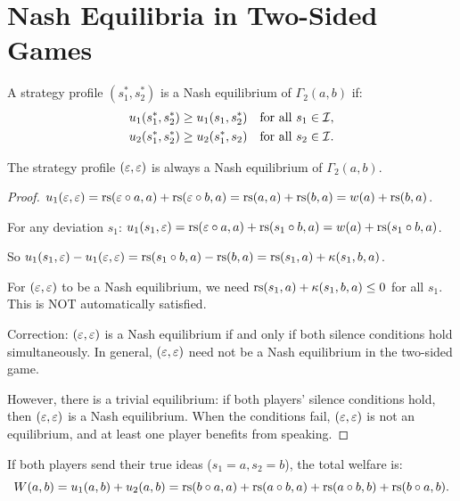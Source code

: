 \section{Nash Equilibria in Two-Sided Games}

\begin{definition}
\label{def:nash-two-sided}
A strategy profile $(s_1^*, s_2^*)$ is a Nash equilibrium of $\Gamma_2(a, b)$
if:
\begin{align*}
u_1(s_1^*, s_2^*) &\geq u_1(s_1, s_2^*) &\text{for all } s_1 \in \mathcal{I}, \\
u_2(s_1^*, s_2^*) &\geq u_2(s_1^*, s_2) &\text{for all } s_2 \in \mathcal{I}.
\end{align*}
\end{definition}

\begin{theorem}
\label{thm:void-void-nash}
The strategy profile $(\varepsilon, \varepsilon)$ is always a Nash equilibrium of
$\Gamma_2(a, b)$.
\end{theorem}

\begin{proof}
$u_1(\varepsilon, \varepsilon) = \mathrm{rs}(\varepsilon \circ a, a) + \mathrm{rs}(\varepsilon \circ b, a)
= \mathrm{rs}(a, a) + \mathrm{rs}(b, a) = w(a) + \mathrm{rs}(b, a)$.

For any deviation $s_1$:
$u_1(s_1, \varepsilon) = \mathrm{rs}(\varepsilon \circ a, a) + \mathrm{rs}(s_1 \circ b, a)
= w(a) + \mathrm{rs}(s_1 \circ b, a)$.

So $u_1(s_1, \varepsilon) - u_1(\varepsilon, \varepsilon) = \mathrm{rs}(s_1 \circ b, a) - \mathrm{rs}(b, a)
= \mathrm{rs}(s_1, a) + \kappa(s_1, b, a)$.

For $(\varepsilon, \varepsilon)$ to be a Nash equilibrium, we need
$\mathrm{rs}(s_1, a) + \kappa(s_1, b, a) \leq 0$ for all $s_1$. This is NOT
automatically satisfied.

Correction: $(\varepsilon, \varepsilon)$ is a Nash equilibrium if and only if both
silence conditions hold simultaneously. In general, $(\varepsilon, \varepsilon)$ need
not be a Nash equilibrium in the two-sided game.

However, there is a trivial equilibrium: if both players' silence conditions
hold, then $(\varepsilon, \varepsilon)$ is a Nash equilibrium. When the conditions fail,
$(\varepsilon, \varepsilon)$ is not an equilibrium, and at least one player benefits from
speaking.
\end{proof}

\begin{theorem}
\label{thm:mutual-honesty}
If both players send their true ideas ($s_1 = a, s_2 = b$), the total
welfare is:
\[
W(a, b) = u_1(a, b) + u_2(a, b) = \mathrm{rs}(b \circ a, a) + \mathrm{rs}(a \circ b, a)
+ \mathrm{rs}(a \circ b, b) + \mathrm{rs}(b \circ a, b).
\]
\end{theorem}

